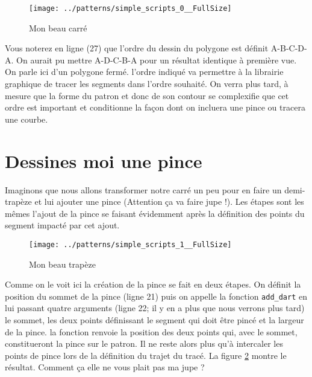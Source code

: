 \documentclass[10pt,a4paper,twoside]{report}
\begin{document}
\begin{figure}
\begin{center}
\texttt{[image: ../patterns/simple\_scripts\_0\_\_FullSize]}
\end{center}
\caption{Mon beau carré}
\label{fig:carre}
\end{figure}

Vous noterez en ligne (27) que l'ordre du dessin du polygone est définit A-B-C-D-A. On aurait pu mettre A-D-C-B-A pour un résultat identique à première vue. On parle ici d'un polygone fermé. l'ordre indiqué va permettre à la librairie graphique de tracer les segments dans l'ordre souhaité. On verra plus tard, à mesure que la forme du patron et donc de son contour se complexifie que cet ordre  est important et conditionne la façon dont on incluera une pince ou tracera une courbe.

\section{Dessines moi une pince}

Imaginons que nous allons transformer notre carré un peu pour en faire un demi-trapèze et lui ajouter une pince (Attention ça va faire jupe !). Les étapes sont les mêmes l'ajout de la pince se faisant évidemment après la définition des points du segment impacté par cet ajout.



\begin{figure}
\begin{center}
\texttt{[image: ../patterns/simple\_scripts\_1\_\_FullSize]}
\end{center}
\caption{Mon beau trapèze}
\label{fig:trapeze}
\end{figure}

Comme on le voit ici la création de la pince se fait en deux étapes. On définit la position du sommet de la pince (ligne 21) puis on appelle la fonction \texttt{add\_dart} en lui passant quatre arguments (ligne 22; il y en a plus que nous verrons plus tard) le sommet, les deux points définissant le segment qui doit être pincé et la largeur de la pince. la fonction renvoie la position des deux points qui, avec le sommet, constitueront la pince sur le patron.  Il ne reste alors plus qu'à intercaler les points de pince lors de la définition du trajet du tracé. La figure \ref{fig:trapeze} montre le résultat. Comment ça elle ne vous plait pas ma jupe ?
\end{document}

